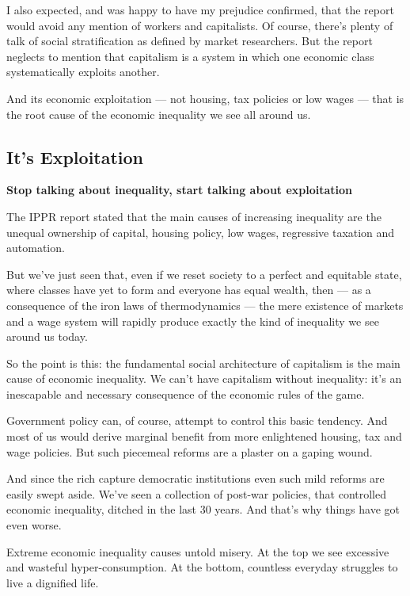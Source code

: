 \documentclass[
]{book}
\begin{document}
I also expected, and was happy to have my prejudice confirmed, that the report would avoid any mention of workers and capitalists. Of course, there's plenty of talk of social stratification as defined by market researchers. But the report neglects to mention that capitalism is a system in which one economic class systematically exploits another.

And its economic exploitation --- not housing, tax policies or low wages --- that is the root cause of the economic inequality we see all around us.

\hypertarget{its-exploitation}{%
\subsection{It's Exploitation}\label{its-exploitation}}

\textbf{Stop talking about inequality, start talking about exploitation}

The IPPR report stated that the main causes of increasing inequality are the unequal ownership of capital, housing policy, low wages, regressive taxation and automation.

But we've just seen that, even if we reset society to a perfect and equitable state, where classes have yet to form and everyone has equal wealth, then --- as a consequence of the iron laws of thermodynamics --- the mere existence of markets and a wage system will rapidly produce exactly the kind of inequality we see around us today.

So the point is this: the fundamental social architecture of capitalism is the main cause of economic inequality. We can't have capitalism without inequality: it's an inescapable and necessary consequence of the economic rules of the game.

Government policy can, of course, attempt to control this basic tendency. And most of us would derive marginal benefit from more enlightened housing, tax and wage policies. But such piecemeal reforms are a plaster on a gaping wound.

And since the rich capture democratic institutions even such mild reforms are easily swept aside. We've seen a collection of post-war policies, that controlled economic inequality, ditched in the last 30 years. And that's why things have got even worse.

Extreme economic inequality causes untold misery. At the top we see excessive and wasteful hyper-consumption. At the bottom, countless everyday struggles to live a dignified life.
\end{document}
